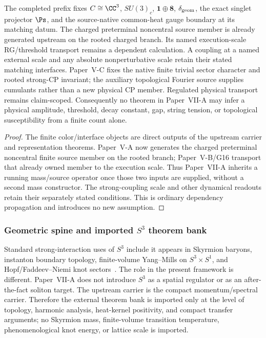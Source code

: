 \documentclass[12pt,a4paper]{article}
\providecommand{\deltageom}{\delta_{\rm geom}}
\begin{document}
\begin{theorem}
\label{p10:thm:inherited-qcd-interface}
The completed prefix fixes \(C\cong\CC^3\), \(SU(3)_c\), \(\mathbf1\oplus\mathbf8\), \(\deltageom\), the exact singlet projector \(\Ps\), and the source-native common-heat gauge boundary at its matching datum.  The charged preterminal noncentral source member is already generated upstream on the rooted charged branch.  Its named execution-scale RG/threshold transport remains a dependent calculation.  A coupling at a named external scale and any absolute nonperturbative scale retain their stated matching interfaces.  Paper~V-C fixes the native finite trivial sector character and rooted strong-CP invariant; the auxiliary topological Fourier source supplies cumulants rather than a new physical CP member. Regulated physical transport remains claim-scoped.  Consequently no theorem in Paper~VII-A may infer a physical amplitude, threshold, decay constant, gap, string tension, or topological susceptibility from a finite count alone.
\end{theorem}
\begin{proof}
The finite color/interface objects are direct outputs of the upstream carrier and representation theorems.  Paper~V-A now generates the charged preterminal noncentral finite source member on the rooted branch; Paper~V-B/G16 transport that already owned member to the execution scale.  Thus Paper~VII-A inherits a running mass/source operator once those two inputs are supplied, without a second mass constructor.  The strong-coupling scale and other dynamical readouts retain their separately stated conditions.  This is ordinary dependency propagation and introduces no new assumption.
\end{proof}


\subsubsection{Geometric spine and imported \texorpdfstring{\(S^3\)}{S³} theorem bank}
\label{p10:sec:geometric-spine-s3-bank}

Standard strong-interaction uses of \(S^3\) include it appears in Skyrmion baryons, instanton boundary topology, finite-volume Yang--Mills on \(S^3\times S^1\), and Hopf/Faddeev--Niemi knot sectors~\cite{Skyrme1961,AtiyahSinger1963,tHooft1976,Unsal2007,FaddeevNiemi1997,VakulenkoKapitanskii1979}.  The role in the present framework is different.  Paper~VII-A does not introduce \(S^3\) as a spatial regulator or as an after-the-fact soliton target.  The upstream carrier is the compact momentum/spectral carrier.  Therefore the external theorem bank is imported only at the level of topology, harmonic analysis, heat-kernel positivity, and compact transfer arguments; no Skyrmion mass, finite-volume transition temperature, phenomenological knot energy, or lattice scale is imported.
\end{document}
